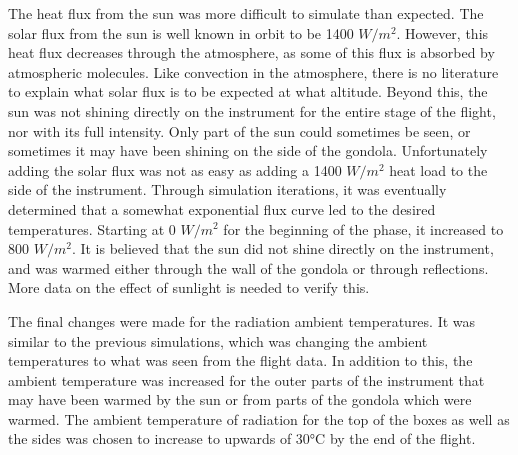The heat flux from the sun was more difficult to simulate than expected. The solar flux from the sun is well known in orbit to be 1400 $W/m^2$. However, this heat flux decreases through the atmosphere, as some of this flux is absorbed by atmospheric molecules. Like convection in the atmosphere, there is no literature to explain what solar flux is to be expected at what altitude. Beyond this, the sun was not shining directly on the instrument for the entire stage of the flight, nor with its full intensity. Only part of the sun could sometimes be seen, or sometimes it may have been shining on the side of the gondola. Unfortunately adding the solar flux was not as easy as adding a 1400 $W/m^2$ heat load to the side of the instrument. Through simulation iterations, it was eventually determined that a somewhat exponential flux curve led to the desired temperatures. Starting at 0 $W/m^2$ for the beginning of the phase, it increased to 800 $W/m^2$. It is believed that the sun did not shine directly on the instrument, and was warmed either through the wall of the gondola or through reflections. More data on the effect of sunlight is needed to verify this.

The final changes were made for the radiation ambient temperatures. It was similar to the previous simulations, which was changing the ambient temperatures to what was seen from the flight data. In addition to this, the ambient temperature was increased for the outer parts of the instrument that may have been warmed by the sun or from parts of the gondola which were warmed. The ambient temperature of radiation for the top of the boxes as well as the sides was chosen to increase to upwards of 30°C by the end of the flight.

